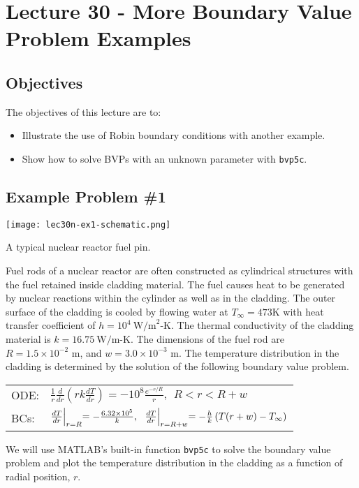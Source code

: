 \chapter{Lecture 30 - More Boundary Value Problem Examples}
\label{ch:lec30n}
\section{Objectives}
The objectives of this lecture are to:
\begin{itemize}
\item Illustrate the use of Robin boundary conditions with another example.
\item Show how to solve BVPs with an unknown parameter with \lstinline[style=myMatlab]{bvp5c}.
\end{itemize}
\setcounter{lstannotation}{0}

\section{Example Problem \#1}
\begin{marginfigure}
\texttt{[image: lec30n-ex1-schematic.png]}
\caption{A typical nuclear reactor fuel pin.}
\label{fig:lec30n-ex1-schematic}
\end{marginfigure}
Fuel rods of a nuclear reactor are often constructed as cylindrical structures with the fuel retained inside cladding material.  The fuel causes heat to be generated by nuclear reactions within the cylinder as well as in the cladding. The outer surface of the cladding is cooled by flowing water at $T_{\infty}=473$K with heat transfer coefficient of $h=10^4\ \text{W/m}^2\text{-K}$.  The thermal conductivity of the cladding material is $k=16.75 \ \text{W/m-K}$.  The dimensions of the fuel rod are $R=1.5\times 10^{-2}\text{ m}$, and $w=3.0\times 10^{-3}\text{ m}$. The temperature distribution in the cladding is determined by the solution of the following boundary value problem.  
\begin{table}
\begin{tabular}{l l}
ODE: & $\frac{1}{r}\frac{d}{dr}\left(rk\frac{dT}{dr}\right)=-10^8\frac{e^{-r/R}}{r}, \ \  R < r < R+w $ \\
BCs: & $\frac{dT}{dr}\Bigl|_{r=R}=-\frac{6.32\times 10^5}{k}, \ \ \frac{dT}{dr}\Bigl|_{r=R+w}=-\frac{h}{k}\left(T(r+w)-T_{\infty}\right)$ \\
\end{tabular}
\end{table}
We will use MATLAB's built-in function \lstinline[style=myMatlab]{bvp5c} to solve the boundary value problem and plot the temperature distribution in the cladding as a function of radial position, $r$.

